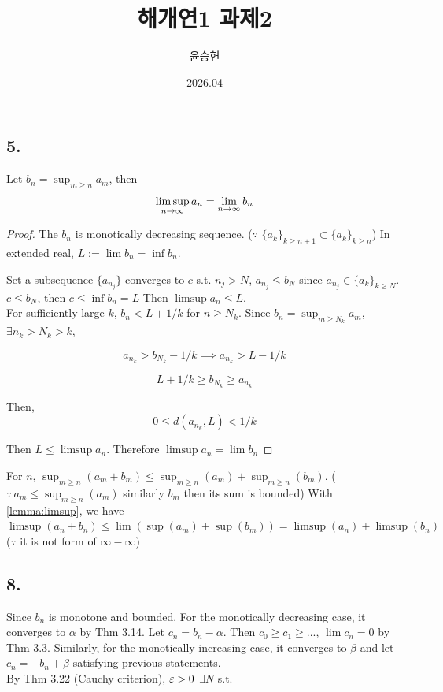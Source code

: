 \documentclass[11pt]{article}
\title{해개연1 과제2}
\author{윤승현}
\date{2026.04}
\begin{document}
\maketitle

\subsection*{5.}

\begin{lemma}
    Let $b_n=\sup_{m \geq n} a_m$, then
    \[
    \limsup_{n \to \infty} a_n = \lim_{n \to \infty} b_n
    \]
    \label{lemma:limsup}
\end{lemma}

\begin{proof}
    The $b_n$ is monotically decreasing sequence. ($\because$ $\{a_k\}_{k \geq n+1} \subset \{a_k\}_{k \geq n}$) In extended real, $L:=\lim b_n=\inf b_n$. 

    Set a subsequence $\{a_{n_j}\}$ converges to $c$ s.t. $n_j > N$, $a_{n_j} \leq b_N$ since $a_{n_j} \in \{a_k\}_{k \geq N}$. $c \leq b_N$, then $c \leq \inf b_n = L$ Then $\limsup a_n \leq L$.\\
    For sufficiently large $k$, $b_n < L + 1/k$ for $n \geq N_k$. Since $b_n = \sup_{m \geq N_k} a_m$, $\exists n_k > N_k > k$,
    
    \[
        a_{n_k}>b_{N_k}-1/k \implies a_{n_k}>L-1/k
    \]

    \[
        L+1/k \geq b_{N_k} \geq a_{n_k}
    \]

    Then, 
    \[
        0 \leq d(a_{n_k}, L) < 1/k
    \]

    Then $L \leq \limsup a_n$. Therefore $\limsup a_n=\lim b_n$
\end{proof}

For $n$, $\sup_{m \geq n}(a_m+b_m) \leq \sup_{m \geq n}(a_m) + \sup_{m \geq n}(b_m)$. ($\because \, a_m \leq \sup_{m \geq n}(a_m)$ similarly $b_m$ then its sum is bounded) With \cref{lemma:limsup}, we have $\limsup(a_n+b_n)\leq\lim(\sup(a_m) + \sup(b_m))=\limsup(a_n)+\limsup(b_n)$ ($\because$ it is not form of $\infty - \infty$)

\subsection*{8.}

Since $b_n$ is monotone and bounded. For the monotically decreasing case, it converges to $\alpha$ by Thm 3.14. Let $c_n=b_n-\alpha$. Then $c_0 \geq c_1 \geq ...$, $\lim c_n=0$ by Thm 3.3. Similarly, for the monotically increasing case, it converges to $\beta$ and let $c_n=-b_n+\beta$ satisfying previous statements.\\
By Thm 3.22 (Cauchy criterion), $\varepsilon>0$ $\exists N$ s.t. 
\end{document}

